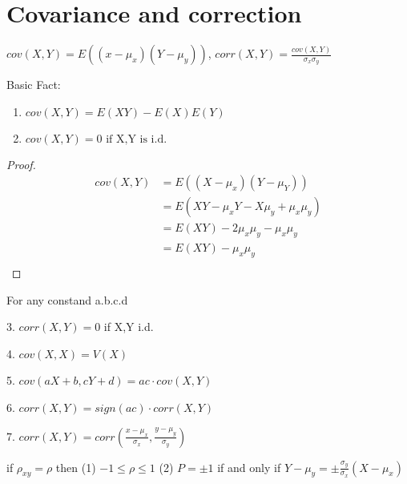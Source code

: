 \documentclass{article}
\begin{document}
\section*{Covariance and correction}
\begin{definition}
    $cov (X,Y)=E((x-\mu_{x})(Y-\mu_{y}))$, $corr (X,Y)=\frac{cov (X,Y)}{\sigma_{x}\sigma_{y}} $
\end{definition}

Basic Fact:
\begin{enumerate}
    \item $cov (X,Y)=E(XY)-E(X)E(Y) $
    \item $cov (X,Y)=0 \text{ if X,Y is i.d.}$
    
\end{enumerate}
\begin{proof}
    \begin{align*}
        cov (X,Y)&= E((X-\mu_{x}) (Y-\mu_{Y})) \\
        &= E(XY-\mu_{x}Y-X\mu_{y}+\mu_{x}\mu_{y}) \\
        &= E( XY )-2 \mu_{x}\mu_{y}-\mu_{x}\mu_{y}\\
        &= E( XY )  -\mu_{x}\mu_{y} \\
    \end{align*}
\end{proof}

For any constand a.b.c.d

3. $corr (X,Y) =0 $ if X,Y i.d. 

4. $cov  (X,X) =V( X )    $

5. $cov  (aX+b, cY+d) =  ac \cdot cov(X,Y)$

6. $ corr(X,Y) = sign (ac) \cdot corr (X,Y)   $

7.  $corr (X,Y) = corr(\frac{x-\mu_{x}}{\sigma_{x}}, \frac{y-\mu_{y}}{\sigma_{y}})  $

if $\rho_{xy}=\rho $ then (1) $-1\leq \rho\leq 1 $ (2) $P=\pm1 $ 
if and only if $Y-\mu_{y}=\pm \frac{\sigma_{y}}{\sigma_{x}}( X-\mu_{x} ) $
\end{document}
